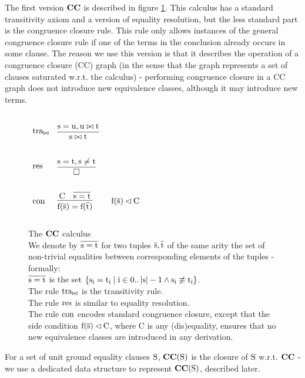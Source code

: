 \bigskip

\noindent
The first version $\mathrm{\mathbf{CC}}$ is described in figure \ref{calculus_CC}. 
This calculus has a standard transitivity axiom and a version of equality resolution, 
but the less standard part is the congruence closure rule. 
This rule only allows instances of the general congruence closure rule if one of the terms in the conclusion already occurs in some clause.
The reason we use this version is that it describes the operation of a congruence closure (CC) graph (in the sense that the graph represents a set of clauses saturated w.r.t. the calculus) - performing congruence closure in a CC graph does not introduce new equivalence classes, although it may introduce new terms.

\begin{figure}
$
\begin{array}{lll}
	\m{tra_{\bowtie}} & \vcenter{\infer[]{\m{s \bowtie t}}{\m{s=u,u \bowtie t}}} & \parbox[c][1.5cm]{2cm}{}\\
	\m{res}           & \vcenter{\infer[]{\emptyClause }{\m{s=t, s \neq t}}} & \parbox[c][1.5cm]{2cm}{}\\
	\m{con}           & \vcenter{\infer[]{\fa{f}{s}=\fa{f}{t} }{\m{C} & \tup{s=t} }} &
\parbox[c][1.5cm]{2cm}{\m{\fa{f}{s} \lhd C}}\\
\end{array}
$
\caption{The $\mathrm{\mathbf{CC}}$ calculus\\
We denote by $\mathrm{\mathrm{\overline{s=t}}}$ for two tuples $\mathrm{\mathrm{\overline{s}},\mathrm{\overline{t}}}$ of the same arity the set of non-trivial equalities between corresponding elements of the tuples - formally:\\
$\mathrm{\mathrm{\overline{s=t}}}$ is the set $\left\{\mathrm{s_i = t_i \mid i \in 0..\left|\mathrm{s}\right|-1 \land s_i \not\equiv t_i}\right\}$.\\
The rule $\mathrm{tra_{\bowtie}}$ is the transitivity rule.\\
The rule $\mathrm{res}$ is similar to equality resolution.\\
The rule $\mathrm{con}$ encodes standard congruence closure, 
except that the side condition $\mathrm{\mathrm{f}(\mathrm{\overline{s}}) \lhd C}$, where C is any (dis)equality, ensures that no new equivalence classes are introduced in any derivation.
}
\label{calculus_CC}
\end{figure}

\noindent
For a set of unit ground equality clauses $\mathrm{S}$, $\mathbf{CC}(\mathrm{S})$ is the closure of $\mathrm{S}$ w.r.t. $\mathrm{\mathbf{CC}}$ - we use a dedicated data structure to represent $\mathbf{CC}(\mathrm{S})$, described later. 

